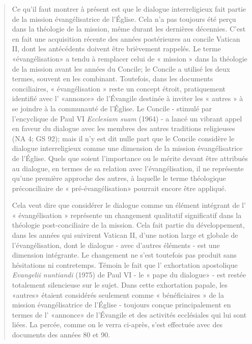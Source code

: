 \begin{quote}
Ce qu'il faut montrer à présent est que le dialogue interreligieux
fait partie de la mission évangélisatrice de l'Église.
Cela n'a pas toujours été perçu dans la théologie de la mission,
même durant les dernières décennies. C'est en fait une acquisition
récente des années postérieures au concile Vatican II,
dont les antécédents doivent être brièvement rappelés.
Le terme «évangélisation» a tendu à remplacer celui de
« mission » dans la théologie de la mission avant les années du
Concile; le Concile a utilisé les deux termes, souvent en les
combinant. Toutefois, dans les documents conciliaires, « évangélisation
» reste un concept étroit, pratiquement identifié avec
l' «annonce» de l'Évangile destinée à inviter les « autres » à
se joindre à la communauté de l'Église. Le Concile - stimulé
par l'encyclique de Paul VI \textit{Ecclesiam suam} (1964) - a lancé
un vibrant appel en faveur du dialogue avec les membres des
autres traditions religieuses (NA 4; GS 92); mais il n'y est dit
nulle part que le Concile considère le dialogue interreligieux
comme une dimension de la mission évangélisatrice de l'Église.
Quels que soient l'importance ou le mérite devant être attribués
au dialogue, en termes de sa relation avec l'évangélisation, il ne représente qu'une première approche des autres, à
laquelle le terme théologique préconciliaire de « pré-évangélisation»  pourrait encore être appliqué.


Cela veut dire que considérer le dialogue comme un élément
intégrant de l' « évangélisation » représente un changement
qualitatif significatif dans la théologie post-conciliaire de
la mission. Cela fait partie du développement, dans les années
qui suivirent Vatican II, d'une notion large et globale de
l'évangélisation, dont le dialogue - avec d'autres éléments -
est une dimension intégrante. Le changement ne s'est toutefois
pas produit sans hésitations ni contretemps. Témoin le fait
que l' exhortation apostolique \textit{Evangelii nuntiandi }(1975) de
Paul VI - le « pape du dialogue» - est restée totalement silencieuse
sur le sujet. Dans cette exhortation papale, les «autres»
étaient considérés seulement comme « bénéficiaires » de la
mission évangélisatrice de l'Église - toujours conçue principalement
en termes de l' «annonce» de l'Évangile et des activités
ecclésiales qui lui sont liées. La percée, comme on le verra ci-après,
s'est effectuée avec des documents des années 80 et 90.
\end{quote}

